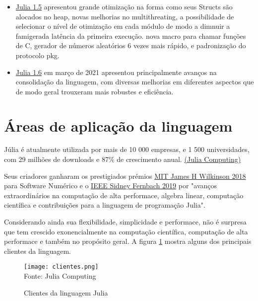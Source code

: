 \begin{itemize}
   \item\href{https://julialang.org/blog/2020/08/julia-1.5-highlights/}{Julia 1.5} apresentou grande otimização na forma como seus Structs são alocados no heap, novas melhorias no multithreating, a possibilidade de selecionar o nível de otimização em cada módulo de modo a dimnuir a famigerada latência da primeira execução. nova macro para chamar funções de C, gerador de números aleatórios 6 vezes mais rápido, e padronização do protocolo pkg. 
   \item\href{https://julialang.org/blog/2021/03/julia-1.6-highlights/}{Julia 1.6} em março de 2021 apresentou principalmente avanços na consolidação da linguagem, com diversas melhorias em diferentes aspectos que de modo geral trouxeram mais robustes e eficiência. 
\end{itemize}


\section{Áreas de aplicação da linguagem}
Júlia é atualmente utilizada por mais de 10 000 empresas, e 1 500 universidades, com 29 milhões de downloads e 87\% de  crescimento anual. \href{https://juliacomputing.com/}{(Julia Computing)}

Seus criadores ganharam os prestigiados prémios \href{https://news.mit.edu/2018/julia-language-co-creators-win-james-wilkinson-prize-numerical-software-1226}{MIT James H Wilkinson 2018} para Software Numérico e o \href{[https://www.computer.org/press-room/2019-news/2019-ieee-fernbach-award-edelman](https://www.computer.org/press-room/2019-news/2019-ieee-fernbach-award-edelman)}{IEEE Sidney Fernbach 2019} por "avanços extraordinários na computação de alta performace, algebra linear, computação científica e contribuições para a linguagem de programação Julia". 

Considerando ainda sua flexibilidade, simplicidade e performace, não é surpresa que tem crescido exonencialmente na computação científica, computação de alta performace e também no propósito geral. A figura \ref{clientes} mostra alguns dos principais clientes da linguagem. \cite{Klok2021}
\begin{figure}[H]
   \begin{center}
       \caption{Clientes da linguagem Julia} \label{clientes}
       \texttt{[image: clientes.png]} \\
       {\tiny \sf Fonte: Julia Computing}
   \end{center}
  \end{figure}


